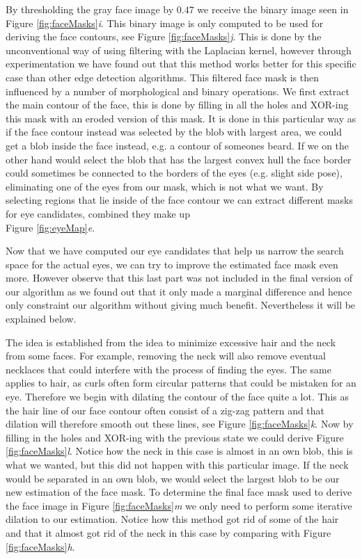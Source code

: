 

By thresholding the gray face image by $0.47$ we receive the binary image seen in Figure \ref{fig:faceMasks}\textit{i}. This binary image is only computed to be used for deriving the face contours, see Figure \ref{fig:faceMasks}\textit{j}. This is done by the unconventional way of using filtering with the Laplacian kernel, however through experimentation we have found out that this method works better for this specific case than other edge detection algorithms. This filtered face mask is then influenced by a number of morphological and binary operations. We first extract the main contour of the face, this is done by filling in all the holes and XOR-ing this mask with an eroded version of this mask. It is done in this particular way as if the face contour instead was selected by the blob with largest area, we could get a blob inside the face instead, e.g. a contour of someones beard. If we on the other hand would select the blob that has the largest convex hull the face border could sometimes be connected to the borders of the eyes (e.g. slight side pose), eliminating one of the eyes from our mask, which is not what we want. By selecting regions that lie inside of the face contour we can extract different masks for eye candidates, combined they make up \\ Figure \ref{fig:eyeMap}\textit{e}.

Now that we have computed our eye candidates that help us narrow the search space for the actual eyes, we can try to improve the estimated face mask even more. However observe that this last part was not included in the final version of our algorithm as we found out that it only made a marginal difference and hence only constraint our algorithm without giving much benefit. Nevertheless it will be explained below. 

The idea is established from the idea to minimize excessive hair and the neck from some faces. For example, removing the neck will also remove eventual necklaces that could interfere with the process of finding the eyes. The same applies to hair, as curls often form circular patterns that could be mistaken for an eye. Therefore we begin with dilating the contour of the face quite a lot. This as the hair line of our face contour often consist of a zig-zag pattern and that dilation will therefore smooth out these lines, see Figure \ref{fig:faceMasks}\textit{k}. Now by filling in the holes and XOR-ing with the previous state we could derive Figure \ref{fig:faceMasks}\textit{l}. Notice how the neck in this case is almost in an own blob, this is what we wanted, but this did not happen with this particular image. If the neck would be separated in an own blob, we would select the largest blob to be our new estimation of the face mask. To determine the final face mask used to derive the face image in Figure \ref{fig:faceMasks}\textit{m} we only need to perform some iterative dilation to our estimation. Notice how this method got rid of some of the hair and that it almost got rid of the neck in this case by comparing with Figure \ref{fig:faceMasks}\textit{h}.




